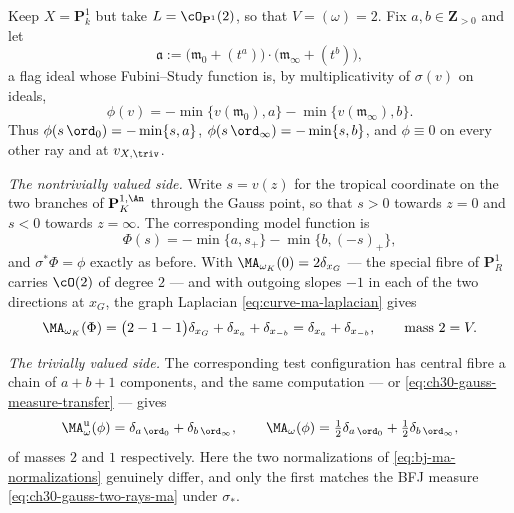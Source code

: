 \begin{example}
\label{ex:ch30-gauss-two-rays}
Keep \(X=\mathbf P^1_k\) but take \(L=\cO_{\mathbf P^1}(2)\), so that
\(V=(\omega)=2\).  Fix \(a,b\in\mathbf Z_{>0}\) and let
\[
 \mathfrak a:=\bigl(\mathfrak m_0+(t^a)\bigr)
              \cdot\bigl(\mathfrak m_\infty+(t^b)\bigr),
\]
a flag ideal whose Fubini--Study function is, by multiplicativity of
\(\sigma(v)\) on ideals,
\[
 \phi(v)=-\min\{v(\mathfrak m_0),a\}-\min\{v(\mathfrak m_\infty),b\} .
\]
Thus \(\phi(s\,\ord_0)=-\min\{s,a\}\), \(\phi(s\,\ord_\infty)=-\min\{s,b\}\),
and \(\phi\equiv0\) on every other ray and at \(v_{X,\triv}\).

\emph{The nontrivially valued side.}  Write \(s=v(z)\) for the tropical
coordinate on the two branches of \(\mathbf P^{1,\An}_K\) through the Gauss
point, so that \(s>0\) towards \(z=0\) and \(s<0\) towards \(z=\infty\).
The corresponding model function is
\[
 \Phi(s)=-\min\{a,s_+\}-\min\{b,(-s)_+\},
\]
and \(\sigma^*\Phi=\phi\) exactly as before.  With
\(\MA_{\omega_K}(0)=2\delta_{x_G}\) --- the special fibre of
\(\mathbf P^1_R\) carries \(\cO(2)\) of degree \(2\) --- and with outgoing
slopes \(-1\) in each of the two directions at \(x_G\), the graph Laplacian
\eqref{eq:curve-ma-laplacian} gives
\begin{equation}
\label{eq:ch30-gauss-two-rays-ma}
 \MA_{\omega_K}(\Phi)
 =\bigl(2-1-1\bigr)\delta_{x_G}+\delta_{x_a}+\delta_{x_{-b}}
 =\delta_{x_a}+\delta_{x_{-b}},
 \qquad\text{mass }2=V .
\end{equation}

\emph{The trivially valued side.}  The corresponding test configuration has
central fibre a chain of \(a+b+1\) components, and the same computation ---
or \eqref{eq:ch30-gauss-measure-transfer} --- gives
\begin{equation}
\label{eq:ch30-gauss-two-rays-triv}
 \MA^{\mathrm u}_\omega(\phi)=\delta_{a\,\ord_0}+\delta_{b\,\ord_\infty},
 \qquad
 \MA_\omega(\phi)
 =\tfrac12\delta_{a\,\ord_0}+\tfrac12\delta_{b\,\ord_\infty},
\end{equation}
of masses \(2\) and \(1\) respectively.  Here the two normalizations of
\eqref{eq:bj-ma-normalizations} genuinely differ, and only the first
matches the BFJ measure \eqref{eq:ch30-gauss-two-rays-ma} under
\(\sigma_*\).


\end{example}
